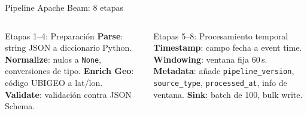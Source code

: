 \documentclass[aspectratio=169, 10pt]{beamer}
\begin{document}
\begin{frame}{Pipeline Apache Beam: 8 etapas}
  \vspace{4pt}
  \begin{columns}[t]
      \begin{exampleblock}{\small Etapas 1--4: Preparaci\'on}
        \scriptsize
        \textbf{Parse}: string JSON a diccionario Python.
        \textbf{Normalize}: nulos a \texttt{None}, conversiones de tipo.
        \textbf{Enrich Geo}: c\'odigo UBIGEO a lat/lon.
        \textbf{Validate}: validaci\'on contra JSON Schema.
      \end{exampleblock}
      \begin{exampleblock}{\small Etapas 5--8: Procesamiento temporal}
        \scriptsize
        \textbf{Timestamp}: campo fecha a event time.
        \textbf{Windowing}: ventana fija 60\,s.
        \textbf{Metadata}: a\~nade \texttt{pipeline\_version},
        \texttt{source\_type}, \texttt{processed\_at}, info de ventana.
        \textbf{Sink}: batch de 100, bulk write.
      \end{exampleblock}
  \end{columns}
\end{frame}
\end{document}
